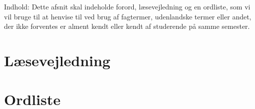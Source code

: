 Indhold: Dette afsnit skal indeholde forord, 
læsevejledning og en ordliste, som vi vil bruge til at henvise til ved brug af fagtermer, udenlandske termer eller andet, der ikke forventes er alment kendt eller kendt af studerende på samme semester. 

\section{Læsevejledning}

\section{Ordliste}